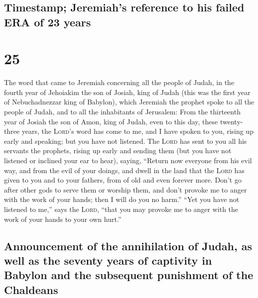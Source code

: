 \hypertarget{timestamp-jeremiahs-reference-to-his-failed-era-of-23-years}{%
\subsection{Timestamp; Jeremiah's reference to his failed ERA of 23
years}\label{timestamp-jeremiahs-reference-to-his-failed-era-of-23-years}}

\hypertarget{section-24}{%
\section{25}\label{section-24}}

 The word that came to Jeremiah concerning all the people
of Judah, in the fourth year of Jehoiakim the son of Josiah, king of
Judah (this was the first year of Nebuchadnezzar king of Babylon),
 which Jeremiah the prophet spoke to all the people of
Judah, and to all the inhabitants of Jerusalem:  From the
thirteenth year of Josiah the son of Amon, king of Judah, even to this
day, these twenty-three years, the \textsc{Lord}'s word has come to me,
and I have spoken to you, rising up early and speaking; but you have not
listened.  The \textsc{Lord} has sent to you all his
servants the prophets, rising up early and sending them (but you have
not listened or inclined your ear to hear),  saying,
``Return now everyone from his evil way, and from the evil of your
doings, and dwell in the land that the \textsc{Lord} has given to you
and to your fathers, from of old and even forever more. 
Don't go after other gods to serve them or worship them, and don't
provoke me to anger with the work of your hands; then I will do you no
harm.''  ``Yet you have not listened to me,'' says the
\textsc{Lord}, ``that you may provoke me to anger with the work of your
hands to your own hurt.''

\hypertarget{announcement-of-the-annihilation-of-judah-as-well-as-the-seventy-years-of-captivity-in-babylon-and-the-subsequent-punishment-of-the-chaldeans}{%
\subsection{Announcement of the annihilation of Judah, as well as the
seventy years of captivity in Babylon and the subsequent punishment of
the
Chaldeans}\label{announcement-of-the-annihilation-of-judah-as-well-as-the-seventy-years-of-captivity-in-babylon-and-the-subsequent-punishment-of-the-chaldeans}}

